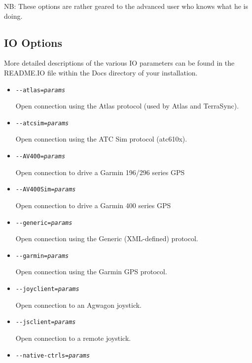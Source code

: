NB: These options are rather geared to the advanced user who knows what he is doing.

\subsection{IO Options}

More detailed descriptions of the various IO parameters can be found in the README.IO file 
within the Docs directory of your \FlightGear{} installation.

\begin{itemize}

\item{\texttt{-$ $-atlas={\it params}}}

  Open connection using the Atlas protocol (used by Atlas and TerraSync).

\item{\texttt{-$ $-atcsim={\it params}}}

  Open connection using the ATC Sim protocol (atc610x).

\item{\texttt{-$ $-AV400={\it params}}}

  Open connection to drive a Garmin 196/296 series GPS

\item{\texttt{-$ $-AV400Sim={\it params}}}

  Open connection to drive a Garmin 400 series GPS

\item{\texttt{-$ $-generic={\it params}}}

  Open connection using the Generic (XML-defined) protocol.

\item{\texttt{-$ $-garmin={\it params}}}

  Open connection using the Garmin GPS protocol.

\item{\texttt{-$ $-joyclient={\it params}}}

  Open connection to an Agwagon joystick.

\item{\texttt{-$ $-jsclient={\it params}}}

  Open connection to a remote joystick.

\item{\texttt{-$ $-native-ctrls={\it params}}}


\end{itemize}
